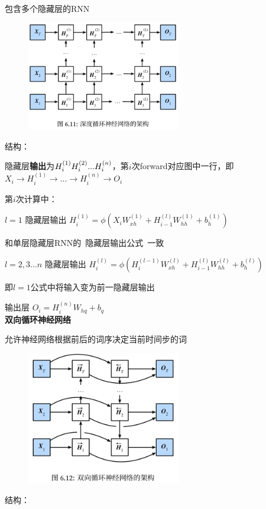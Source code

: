 \documentclass[UTF8]{ctexart}
\begin{document}
  包含多个隐藏层的RNN
  \begin{figure}[H] %
    \centering %
    \includegraphics[width=0.6\textwidth]{note_images/deep_RNN.png} %
  \end{figure}
  结构：

  \quad 隐藏层\textbf{输出}为$H_i^{(1)} \space H_i^{(2)}...H_i^{(n)}$，第$i$次forward对应图中一行，即$X_i \rightarrow  H_i^{(1)} \rightarrow  ... \rightarrow  H_i^{(n)} \rightarrow O_i$

  \quad 第$i$次计算中：

  \quad \quad $l = 1$ 隐藏层输出 $H_i^{(1)} = \phi (X_iW_{xh}^{(1)} + H_{i-1}^{(l)}W_{hh}^{(1)} + b_h^{(1)})$

  \quad \quad \quad 和单层隐藏层RNN的\ 隐藏层输出公式\ 一致

  \quad \quad $l = 2,3...n$ 隐藏层输出 $H_i^{(l)} = \phi (H_i^{(l-1)}W_{xh}^{(l)} + H_{i-1}^{(l)}W_{hh}^{(l)} + b_h^{(l)})$

  \quad \quad \quad 即$l=1$公式中将输入变为前一隐藏层输出

  \quad \quad 输出层 $O_i = H_{i}^{(n)}W_{hq} + b_q$\\
\textbf{双向循环神经网络}

  允许神经网络根据前后的词序决定当前时间步的词
  \begin{figure}[H] %
    \centering %
    \includegraphics[width=0.6\textwidth]{note_images/double_deep_RNN.png} %
  \end{figure}
  结构：
\end{document}
